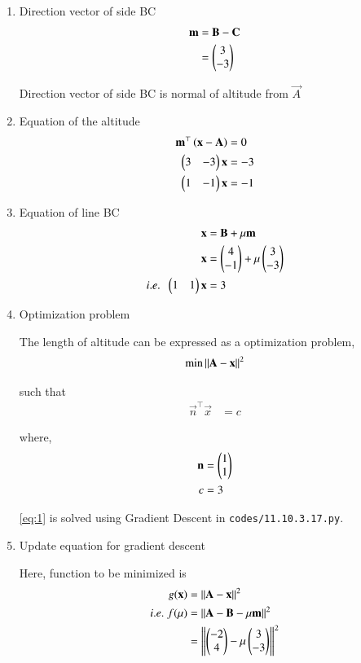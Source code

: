 \documentclass[journal,12pt,twocolumn]{IEEEtran}
\begin{document}
\begin{enumerate}

\item Direction vector of side BC
	\begin{align}
		\mathbf{m} &= \mathbf{B} - \mathbf{C} \\
		&= \begin{pmatrix}3 \\ -3\end{pmatrix} 
	\end{align}

 Direction vector of side BC is normal of altitude from $\vec{A}$

\item Equation of the altitude
	\begin{align}
		\mathbf{m}^{\top} \left(\mathbf{x} - \mathbf{A}\right) &= 0 \\
		\begin{pmatrix}3 & -3\end{pmatrix} \mathbf{x} &=  -3 \\
		\begin{pmatrix}1 & -1\end{pmatrix} \mathbf{x} &=  -1
	\end{align}

\item Equation of line BC
	\begin{align}
		\mathbf{x} &= \mathbf{B} + \mu \mathbf{m}  \\
		\mathbf{x} &= \begin{pmatrix}4 \\ -1\end{pmatrix} + \mu \begin{pmatrix}3 \\ -3\end{pmatrix} \\
		i.e. \; \; \begin{pmatrix}1 & 1\end{pmatrix} \mathbf{x} &=  3
	\end{align}

\item Optimization problem

	The length of altitude can be expressed as a optimization problem,
		\begin{align}
			\text{min} \left\lVert\mathbf{A} - \mathbf{x}\right\rVert^2  \label{eq:1}
		\end{align}

		such that 
		\begin{align}
			\vec{n}^{\top} \vec{x} &=  c
		\end{align}

		where,
		\begin{align}
			\mathbf{n} &= \begin{pmatrix}1\\1\end{pmatrix} \\
			c &= 3
		\end{align}

		\eqref{eq:1} is solved using Gradient Descent in \texttt{codes/11.10.3.17.py}. 

	\item Update equation for gradient descent


	Here, function to be minimized is
	\begin{align}
		g(\mathbf{x}) &= \left\lVert\mathbf{A} - \mathbf{x}\right\rVert^2\\
		i.e. \; f(\mu) &= \left\lVert\mathbf{A} - \mathbf{B} - \mu \mathbf{m}\right\rVert^2\\
		&= \left\lVert\begin{pmatrix}-2 \\ 4\end{pmatrix} - \mu \begin{pmatrix}3 \\ -3\end{pmatrix}\right\rVert^2
	\end{align}


\end{enumerate}
\end{document}
